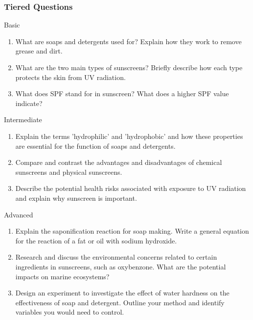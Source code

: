 \subsubsection{Tiered Questions}
\begin{tieredquestions}{Basic}
\begin{enumerate}
    \item What are soaps and detergents used for? Explain how they work to remove grease and dirt.
    \item What are the two main types of sunscreens? Briefly describe how each type protects the skin from UV radiation.
    \item What does SPF stand for in sunscreen? What does a higher SPF value indicate?
\end{enumerate}
\end{tieredquestions}

\begin{tieredquestions}{Intermediate}
\begin{enumerate}
    \item Explain the terms 'hydrophilic' and 'hydrophobic' and how these properties are essential for the function of soaps and detergents.
    \item Compare and contrast the advantages and disadvantages of chemical sunscreens and physical sunscreens.
    \item Describe the potential health risks associated with exposure to UV radiation and explain why sunscreen is important.
\end{enumerate}
\end{tieredquestions}

\begin{tieredquestions}{Advanced}
\begin{enumerate}
    \item Explain the saponification reaction for soap making. Write a general equation for the reaction of a fat or oil with sodium hydroxide.
    \item Research and discuss the environmental concerns related to certain ingredients in sunscreens, such as oxybenzone. What are the potential impacts on marine ecosystems?
    \item Design an experiment to investigate the effect of water hardness on the effectiveness of soap and detergent. Outline your method and identify variables you would need to control.
\end{enumerate}
\end{tieredquestions}

